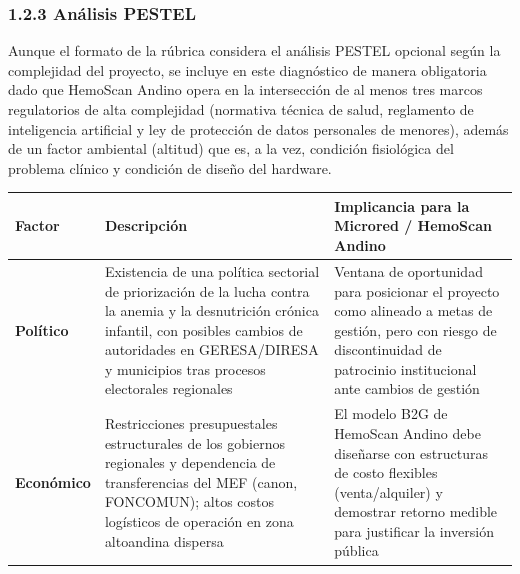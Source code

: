 \documentclass[11pt,a4paper]{article}
\begin{document}
\subsubsection{1.2.3 Análisis PESTEL}\label{anuxe1lisis-pestel}

Aunque el formato de la rúbrica considera el análisis PESTEL opcional según la complejidad del proyecto, se incluye en este diagnóstico de manera obligatoria dado que HemoScan Andino opera en la intersección de al menos tres marcos regulatorios de alta complejidad (normativa técnica de salud, reglamento de inteligencia artificial y ley de protección de datos personales de menores), además de un factor ambiental (altitud) que es, a la vez, condición fisiológica del problema clínico y condición de diseño del hardware.

{\small
\begin{longtable}[]{@{}
  >{\raggedright\arraybackslash}p{}
  >{\raggedright\arraybackslash}p{}
  >{\raggedright\arraybackslash}p{}@{}}
\toprule\noalign{}
\begin{minipage}[b]{\linewidth}\raggedright
Factor
\end{minipage} & \begin{minipage}[b]{\linewidth}\raggedright
Descripción
\end{minipage} & \begin{minipage}[b]{\linewidth}\raggedright
Implicancia para la Microred / HemoScan Andino
\end{minipage} \\
\midrule\noalign{}
\endhead
\bottomrule\noalign{}
\endlastfoot
\textbf{Político} & Existencia de una política sectorial de priorización de la lucha contra la anemia y la desnutrición crónica infantil, con posibles cambios de autoridades en GERESA/DIRESA y municipios tras procesos electorales regionales & Ventana de oportunidad para posicionar el proyecto como alineado a metas de gestión, pero con riesgo de discontinuidad de patrocinio institucional ante cambios de gestión \\
\textbf{Económico} & Restricciones presupuestales estructurales de los gobiernos regionales y dependencia de transferencias del MEF (canon, FONCOMUN); altos costos logísticos de operación en zona altoandina dispersa & El modelo B2G de HemoScan Andino debe diseñarse con estructuras de costo flexibles (venta/alquiler) y demostrar retorno medible para justificar la inversión pública \\

\end{longtable}}
\end{document}

